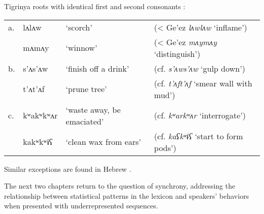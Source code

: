 \ex Tigrinya roots with identical first and second consonants \citep{Buckley1990a}: \\
\begin{tabular}{l l l l}
a. & lʌlʌw     & `scorch'                   & (< Ge'ez \emph{lʌwlʌw} `inflame')     \\
   & mʌmʌy     & `winnow'                   & (< Ge'ez \emph{mʌymʌy} `distinguish') \\
b. & s’ʌs’ʌw   & `finish off a drink'       & (cf. \emph{s’ʌws’ʌw} `gulp down')           \\
   & t’ʌt’ʌf   & `prune tree'               & (cf. \emph{t’ʌft’ʌf} `smear wall with mud') \\
c. & kʷakʷkʷʌr & `waste away, be emaciated' & (cf. \emph{kʷarkʷʌr} `interrogate')         \\
   & kakʷkʷɨʕ  & `clean wax from ears'      & (cf. \emph{kaʕkʷɨʕ} `start to form pods')   \\
\end{tabular}
\xe

Similar exceptions are found in 
Hebrew \citep[][29]{Bat-El2005}.

The next two chapters return to the question of synchrony, addressing the relationship between statistical patterns in the lexicon and speakers' behaviors when presented with underrepresented sequences.
